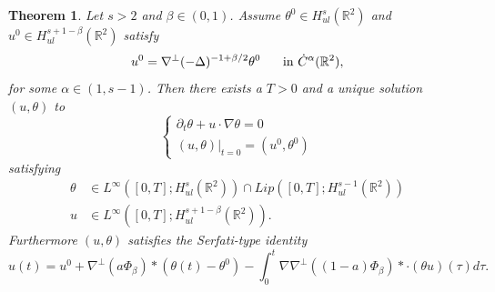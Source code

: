 \documentclass[12pt,xcolor=svgnames]{amsart}
\newtheorem{theorem}{Theorem}[section]
\newcommand{\R}{\mathbb{R}}
\begin{document}
\begin{theorem}
\label{Hsul Result}
Let $s>2$ and $\beta \in (0,1)$. Assume $\theta^0 \in H_{ul}^s(\R^2)$ and $u^0\in H_{ul}^{s+1-\beta}(\R^2)$ satisfy
$$
u^0 = \nabla^{\perp}(-\Delta)^{-1+\beta/2}\theta^0 \hspace{.5cm} \text{ in } \dot{C}^{\alpha}(\R^2),
$$
for some $\alpha \in (1,s-1)$. Then there exists a $T>0$ and a unique solution $(u,\theta)$ to 
\begin{equation*}
\begin{cases}
    \partial_t \theta + u \cdot \nabla \theta=0\\
    (u,\theta)\vert_{t=0}=(u^0,\theta^0)
\end{cases}
\end{equation*}
satisfying
\begin{align*}
\theta &\in L^{\infty}([0,T];H_{ul}^s(\R^2)) \cap Lip([0,T];H_{ul}^{s-1}(\R^2)) \\
u &\in L^{\infty}([0,T]; H_{ul}^{s+1-\beta}(\R^2)). 
\end{align*}
Furthermore $(u,\theta)$ satisfies the Serfati-type identity
\begin{equation}
\label{Sobolev Serfati Identity}
u(t)=u^0 + \nabla^{\perp}(a\Phi_{\beta}) \ast (\theta(t)-\theta^0) - \int_0^t \nabla\nabla^{\perp}((1-a)\Phi_{\beta}) \ast\cdot (\theta u )(\tau)d\tau.
\end{equation}
\end{theorem}
\end{document}
